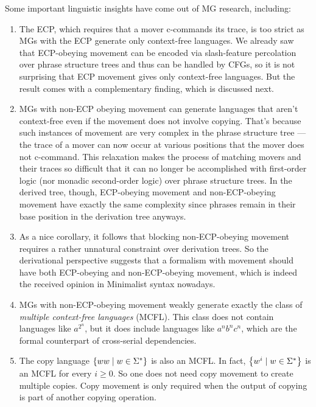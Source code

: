 Some important linguistic insights have come out of MG research, including:
%
\begin{enumerate}
    \item The ECP, which requires that a mover c-commands its trace, is too strict as MGs with the ECP generate only context-free languages.
        We already saw that ECP-obeying movement can be encoded via slash-feature percolation over phrase structure trees and thus can be handled by CFGs, so it is not surprising that ECP movement gives only context-free languages.
        But the result comes with a complementary finding, which is discussed next.
    \item MGs with non-ECP obeying movement can generate languages that aren't context-free even if the movement does not involve copying.
        That's because such instances of movement are very complex in the phrase structure tree --- the trace of a mover can now occur at various positions that the mover does not c-command.
        This relaxation makes the process of matching movers and their traces so difficult that it can no longer be accomplished with first-order logic (nor monadic second-order logic) over phrase structure trees.
        In the derived tree, though, ECP-obeying movement and non-ECP-obeying movement have exactly the same complexity since phrases remain in their base position in the derivation tree anyways.
    \item As a nice corollary, it follows that blocking non-ECP-obeying movement requires a rather unnatural constraint over derivation trees.
        So the derivational perspective suggests that a formalism with movement should have both ECP-obeying and non-ECP-obeying movement, which is indeed the received opinion in Minimalist syntax nowadays.
    \item MGs with non-ECP-obeying movement weakly generate exactly the class of \emph{multiple context-free languages} (MCFL).
        This class does not contain languages like $a^{2^n}$, but it does include languages like $a^n b^n c^n$, which are the formal counterpart of cross-serial dependencies. 
    \item The copy language $\left \{ ww \mid w \in \Sigma^* \right \}$ is also an MCFL\@.
        In fact, $\left \{ w^i \mid w \in \Sigma^* \right \}$ is an MCFL for every $i \geq 0$.
        So one does not need copy movement to create multiple copies.
        Copy movement is only required when the output of copying is part of another copying operation.

\end{enumerate}
